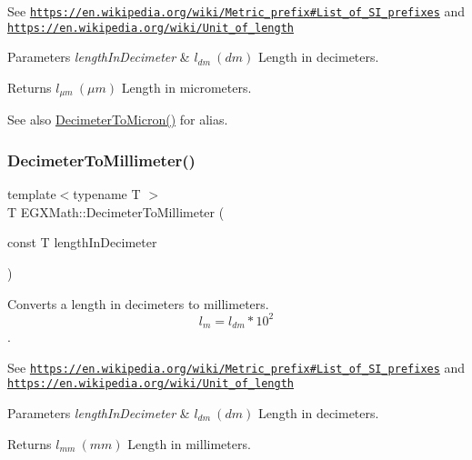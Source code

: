 See \href{https://en.wikipedia.org/wiki/Metric_prefix#List_of_SI_prefixes}{\tt https\+://en.\+wikipedia.\+org/wiki/\+Metric\+\_\+prefix\#\+List\+\_\+of\+\_\+\+S\+I\+\_\+prefixes} and \href{https://en.wikipedia.org/wiki/Unit_of_length}{\tt https\+://en.\+wikipedia.\+org/wiki/\+Unit\+\_\+of\+\_\+length} 
\begin{DoxyParams}{Parameters}
{\em length\+In\+Decimeter} & $ l_{dm}\ (dm)$ Length in decimeters. \\
\hline
\end{DoxyParams}
\begin{DoxyReturn}{Returns}
$ l_{\mu m}\ (\mu m)$ Length in micrometers. 
\end{DoxyReturn}
\begin{DoxySeeAlso}{See also}
\mbox{\hyperlink{group___e_g_x_math-_conversions-_length_conversions-_decimeter-_non-_s_i_gaebafc6e167156bb5158e5d335b25334b}{Decimeter\+To\+Micron()}} for alias. 
\end{DoxySeeAlso}
\mbox{\label{group___e_g_x_math-_conversions-_length_conversions-_decimeter-_s_i_gad899e8bf5ade8cdc82e00b0fc81c2ee5}} 
\subsubsection{\texorpdfstring{Decimeter\+To\+Millimeter()}{DecimeterToMillimeter()}}
{\footnotesize\ttfamily template$<$typename T $>$ \\
T E\+G\+X\+Math\+::\+Decimeter\+To\+Millimeter (\begin{DoxyParamCaption}\item[{const T}]{length\+In\+Decimeter }\end{DoxyParamCaption})}



Converts a length in decimeters to millimeters. \[ l_{m}=l_{dm} * 10^{2} \]. 

See \href{https://en.wikipedia.org/wiki/Metric_prefix#List_of_SI_prefixes}{\tt https\+://en.\+wikipedia.\+org/wiki/\+Metric\+\_\+prefix\#\+List\+\_\+of\+\_\+\+S\+I\+\_\+prefixes} and \href{https://en.wikipedia.org/wiki/Unit_of_length}{\tt https\+://en.\+wikipedia.\+org/wiki/\+Unit\+\_\+of\+\_\+length} 
\begin{DoxyParams}{Parameters}
{\em length\+In\+Decimeter} & $ l_{dm}\ (dm)$ Length in decimeters. \\
\hline
\end{DoxyParams}
\begin{DoxyReturn}{Returns}
$ l_{mm}\ (mm)$ Length in millimeters. 
\end{DoxyReturn}
\mbox{\label{group___e_g_x_math-_conversions-_length_conversions-_decimeter-_s_i_ga5bf2905937fea582ee35031d9017807f}} 
